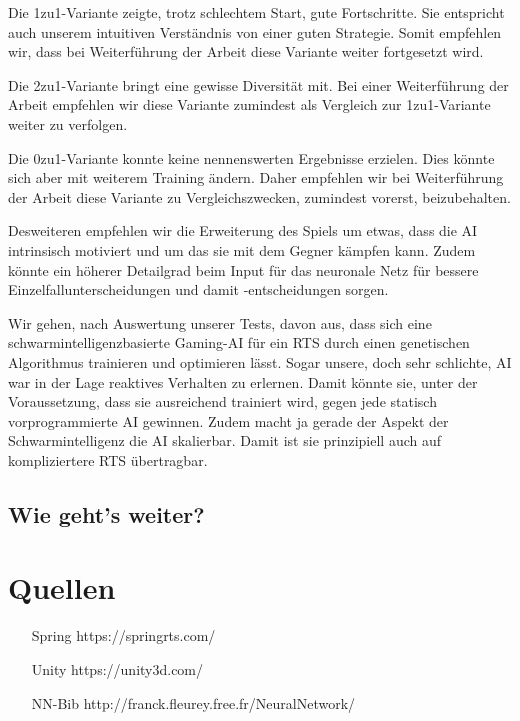 \documentclass[
	12pt,
	a4paper,
	BCOR10mm,
	DIV14,
	headsepline,
	usegeometry,
]{scrreprt}
\begin{document}
Die 1zu1-Variante zeigte, trotz schlechtem Start, gute Fortschritte.
Sie entspricht auch unserem intuitiven Verständnis von einer guten Strategie.
Somit empfehlen wir, dass bei Weiterführung der Arbeit diese Variante weiter fortgesetzt wird.

Die 2zu1-Variante bringt eine gewisse Diversität mit.
Bei einer Weiterführung der Arbeit empfehlen wir diese Variante zumindest als Vergleich zur 1zu1-Variante weiter zu verfolgen.

Die 0zu1-Variante konnte keine nennenswerten Ergebnisse erzielen.
Dies könnte sich aber mit weiterem Training ändern.
Daher empfehlen wir bei Weiterführung der Arbeit diese Variante zu Vergleichszwecken, zumindest vorerst, beizubehalten.

Desweiteren empfehlen wir die Erweiterung des Spiels um etwas, dass die AI intrinsisch motiviert und um das sie mit dem Gegner kämpfen kann.
Zudem könnte ein höherer Detailgrad beim Input für das neuronale Netz für bessere Einzelfallunterscheidungen und damit -entscheidungen sorgen.

Wir gehen, nach Auswertung unserer Tests, davon aus, dass sich eine schwarmintelligenzbasierte Gaming-AI für ein RTS durch einen genetischen Algorithmus trainieren und optimieren lässt.
Sogar unsere, doch sehr schlichte, AI war in der Lage reaktives Verhalten zu erlernen.
Damit könnte sie, unter der Voraussetzung, dass sie ausreichend trainiert wird, gegen jede statisch vorprogrammierte AI gewinnen.
Zudem macht ja gerade der Aspekt der Schwarmintelligenz die AI skalierbar.
Damit ist sie prinzipiell auch auf kompliziertere RTS übertragbar.



\section{Wie geht's weiter?}





\appendix
\appendixpage

\chapter{Quellen}

\begin{itemize}
	\item[Spring] https://springrts.com/
	\item[Unity] https://unity3d.com/
	\item[NN-Bib] http://franck.fleurey.free.fr/NeuralNetwork/
\end{itemize}

\listoffigures
\end{document}
